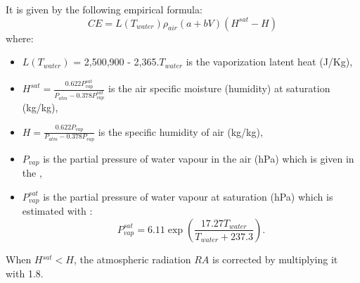  It is given by the following empirical formula:
\begin{equation*}
CE = L(T_{water})\rho_{air}\left(a+bV \right) \left(H^{sat}-H \right)
\end{equation*}
where:
\begin{itemize}
\item $L(T_{water})$ = 2,500,900 - 2,365.$T_{water}$ is the vaporization latent heat (J/Kg),
\item $H^{sat}=\frac{0.622P^{sat}_{vap}}{P_{atm}-0.378P^{sat}_{vap}}$
is the air specific moisture (humidity) at saturation (kg/kg),
\item $H = \frac{0.622P_{vap}}{P_{atm}-0.378P_{vap}}$ is the specific humidity of air (kg/kg),
\item $P_{vap}$ is the partial pressure of water vapour in the air (hPa)
which is given in the ,
\item $P^{sat}_{vap}$ is the partial pressure of water vapour at saturation (hPa) which is estimated with :
\begin{equation*}
P^{sat}_{vap} = 6.11 \exp \left(\frac{17.27T_{water}}{T_{water}+237.3} \right).
\end{equation*}
\end{itemize}

When $H{}^{sat} < H$, the atmospheric radiation $RA$ is corrected by multiplying it with 1.8.
